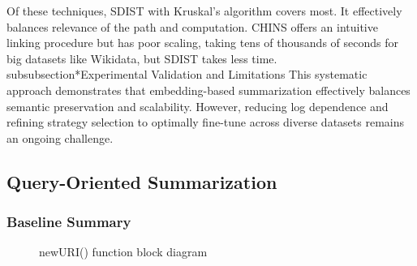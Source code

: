 \documentclass[article,submit,pdftex,moreauthors]{Definitions/mdpi}
\begin{document}
Of these techniques, SDIST with Kruskal's algorithm covers most. It effectively balances relevance of the path and computation. CHINS offers an intuitive linking procedure but has poor scaling, taking tens of thousands of seconds for big datasets like Wikidata, but SDIST takes less time. \\subsubsection*{Experimental Validation and Limitations} This systematic approach demonstrates that embedding-based summarization effectively balances semantic preservation and scalability. However, reducing log dependence and refining strategy selection to optimally fine-tune across diverse datasets remains an ongoing challenge.

\newpage

\subsection{Query-Oriented Summarization}

\subsubsection{\textbf{Baseline Summary}}

    \begin{figure}[H]
        \centering
        \caption{newURI() function block diagram}
        \label{fig:new_URI_function}
    \end{figure}
\end{document}
